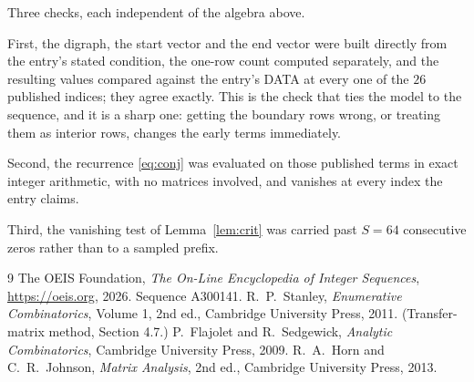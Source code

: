 \documentclass[11pt,a4paper]{article}
\theoremstyle{plain}
\theoremstyle{definition}
\begin{document}
Three checks, each independent of the algebra above.

First, the digraph, the start vector and the end vector were built directly from the
entry's stated condition, the one-row count computed separately, and the resulting values
compared against the entry's DATA at every one of the $26$ published indices; they
agree exactly. This is the check that ties the model to the sequence, and it is a sharp one:
getting the boundary rows wrong, or treating them as interior rows, changes the early terms
immediately.

Second, the recurrence \eqref{eq:conj} was evaluated on those published terms in exact
integer arithmetic, with no matrices involved, and vanishes at every index the entry claims.

Third, the vanishing test of Lemma~\ref{lem:crit} was carried past $S=64$ consecutive
zeros rather than to a sampled prefix.

\begin{thebibliography}{9}
 The OEIS Foundation, \emph{The On-Line Encyclopedia of Integer
Sequences}, \url{https://oeis.org}, 2026. Sequence A300141.
 R.~P.~Stanley, \emph{Enumerative Combinatorics}, Volume 1, 2nd ed.,
Cambridge University Press, 2011. (Transfer-matrix method, Section 4.7.)
 P.~Flajolet and R.~Sedgewick, \emph{Analytic Combinatorics}, Cambridge
University Press, 2009.
 R.~A.~Horn and C.~R.~Johnson, \emph{Matrix Analysis}, 2nd ed., Cambridge
University Press, 2013.
\end{thebibliography}
\end{document}
